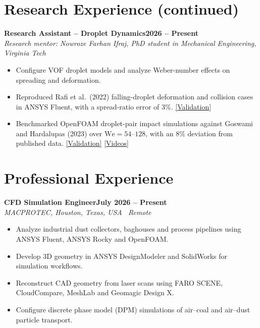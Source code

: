\documentclass[11pt,a4paper]{article}
\newcommand{\cvlink}[2]{\href{#1}{\textnormal{\small[#2]}}}
\newcommand{\role}[3]{%
  \Needspace{4\baselineskip}%
  \textbf{#1}\hfill\textbf{#2}\\
  \textit{#3}\par
}
\begin{document}
\newpage
\section*{Research Experience (continued)}
\role{Research Assistant -- Droplet Dynamics}{2026 -- Present}
{Research mentor: Nowroze Farhan Ifraj, PhD student in Mechanical Engineering, Virginia Tech}
\begin{itemize}
  \item Configure VOF droplet models and analyze Weber-number effects on spreading and deformation.
  \item Reproduced Rafi et al.\ (2022) falling-droplet deformation and collision cases in
  ANSYS Fluent, with a spread-ratio error of 3\%.
  \cvlink{https://meherabhossen.pages.dev/\#validation-ref4-heading}{Validation}
  \item Benchmarked OpenFOAM droplet-pair impact simulations against Goswami and Hardalupas
  (2023) over \(\mathrm{We}=54\text{--}128\), with an 8\% deviation from published data.
  \cvlink{https://meherabhossen.pages.dev/\#validation-ref5-heading}{Validation}
  \cvlink{https://meherabhossen.pages.dev/\#videos}{Videos}
\end{itemize}

\section*{Professional Experience}
\role{CFD Simulation Engineer}{July 2026 -- Present}
{MACPROTEC, Houston, Texas, USA \textbar\ Remote}
\begin{itemize}
  \item Analyze industrial dust collectors, baghouses and process pipelines using
  ANSYS Fluent, ANSYS Rocky and OpenFOAM.
  \item Develop 3D geometry in ANSYS DesignModeler and SolidWorks for simulation workflows.
  \item Reconstruct CAD geometry from laser scans using FARO SCENE, CloudCompare,
  MeshLab and Geomagic Design X.
  \item Configure discrete phase model (DPM) simulations of air--coal and air--dust particle transport.
\end{itemize}
\end{document}
